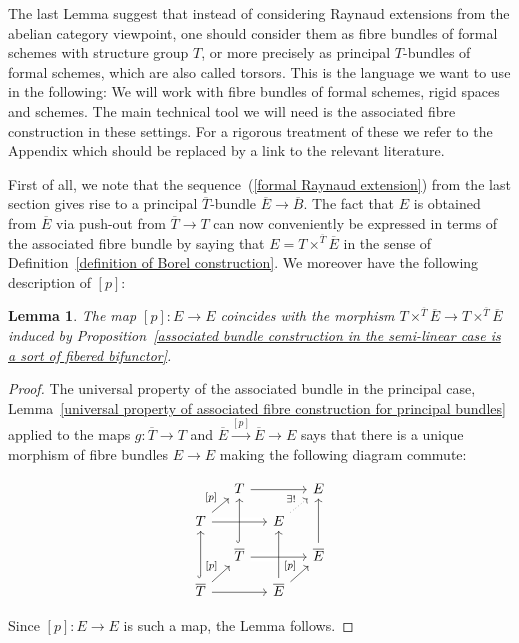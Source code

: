 \documentclass[11pt,oneside]{amsart}
\newtheorem{lemma}[theorem]{Lemma}
\theoremstyle{definition}
\theoremstyle{remark}
\begin{document}
	The last Lemma suggest that instead of considering Raynaud extensions from the abelian category viewpoint, one should consider them as fibre bundles of formal schemes with structure group $T$, or more precisely as principal $T$-bundles of formal schemes, which are also called torsors. This is the language we want to use in the following: We will work with fibre bundles of formal schemes, rigid spaces and schemes. The main technical tool we will need is the associated fibre construction in these settings. For a rigorous  treatment of these we refer to the Appendix {\color{red} which should be replaced by a link to the relevant literature}.
	
	First of all, we note that the sequence~(\ref{formal Raynaud extension}) from the last section gives rise to a principal $\overline{T}$-bundle
	$\overline{E}\rightarrow \overline{B}$. The fact that $E$ is obtained from $\overline{E}$ via push-out from $\overline{T}\rightarrow T$ can now conveniently be expressed in terms of the associated fibre bundle by saying that $E = T\times^{\overline{T}}\overline{E}$ in the sense of Definition~\ref{definition of Borel construction}. We moreover have the following description of $[p]$:
	\begin{lemma}\label{p-multiplication is induced from Borel construction}
		The map $[p]:E\rightarrow E$ coincides with the morphism $T\times^{\overline{T}}\overline{E}\rightarrow T\times^{\overline{T}}\overline{E}$ induced by
		Proposition~\ref{associated bundle construction in the semi-linear case is a sort of fibered bifunctor}.
	\end{lemma}
	\begin{proof}
		The universal property of the associated bundle in the principal case, Lemma~\ref{universal property of associated fibre construction for principal bundles} applied to the maps $g:\overline{T}\rightarrow T$ and $\overline{E}\xrightarrow{[p]} \overline{E}\rightarrow E$ says that there is a unique morphism of fibre bundles $E\rightarrow E$ making the following diagram commute:
		\begin{center}
			\begin{equation}\label{rigid p-multiplication cube}
			\begin{tikzcd}[row sep = small, column sep = small]
				& T \arrow[rr] &  & E \\
				T \arrow[ru, "{[p]}"] \arrow[rr,crossing over] &  & E \arrow[ru, "\exists!", dotted] &  \\
				& \overline{T} \arrow[uu, hook] \arrow[rr,crossing over] &  & \overline{E} \arrow[uu] \\
				\overline{T} \arrow[ru, "{[p]}"] \arrow[uu, hook] \arrow[rr] &  & \overline{E} \arrow[ru, "{[p]}"] \arrow[uu] & 
			\end{tikzcd}
			\end{equation}
		\end{center}
		Since $[p]:E\rightarrow E$ is such a map, the Lemma follows.
	\end{proof}
	
\end{document}
